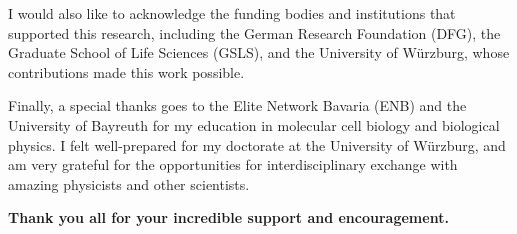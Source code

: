 {  \vspace{\vhalf}

  \noindent I would also like to acknowledge the funding bodies and
  institutions that supported this research, including the German Research
  Foundation (DFG), the Graduate School of Life Sciences (GSLS), and the University of
  Würzburg, whose contributions made this work possible.

  \noindent Finally, a special thanks goes to the Elite Network Bavaria (ENB)
  and the University of Bayreuth for my education in molecular cell biology
  and biological physics. I felt well-prepared for my doctorate at the
  University of Würzburg, and am very grateful for the opportunities for
  interdisciplinary exchange with amazing physicists and other scientists.

  \begin{center}
      {\textbf{Thank you all for your incredible support and encouragement.}}
  \end{center}
 }

